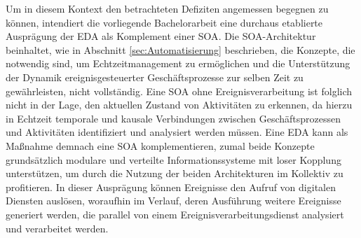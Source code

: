Um in diesem Kontext den betrachteten Defiziten angemessen begegnen zu können, intendiert die vorliegende Bachelorarbeit eine durchaus etablierte Ausprägung der \ac{EDA} als Komplement einer \ac{SOA}.
Die \ac{SOA}-Architektur beinhaltet, wie in Abschnitt \ref{sec:Automatisierung} beschrieben, die Konzepte, die notwendig sind, um Echtzeitmanagement zu ermöglichen und die Unterstützung der Dynamik ereignisgesteuerter Geschäftsprozesse zur selben Zeit zu gewährleisten, nicht vollständig.
Eine \ac{SOA} ohne Ereignisverarbeitung ist folglich nicht in der Lage, den aktuellen Zustand von Aktivitäten zu erkennen, da hierzu in Echtzeit temporale und kausale Verbindungen zwischen Geschäftsprozessen und Aktivitäten identifiziert und analysiert werden müssen. 
Eine \ac{EDA} kann als Maßnahme demnach eine \ac{SOA} komplementieren, zumal beide Konzepte grundsätzlich modulare und verteilte Informationssysteme mit loser Kopplung unterstützen, um durch die Nutzung der beiden Architekturen im Kollektiv zu profitieren. 
\cite{Bruns.2010}
In dieser Ausprägung können Ereignisse den Aufruf von digitalen Diensten auslösen, woraufhin im Verlauf, deren Ausführung weitere Ereignisse generiert werden, die parallel von einem Ereignisverarbeitungsdienst analysiert und verarbeitet werden. 
\cite{Bruns.2010}